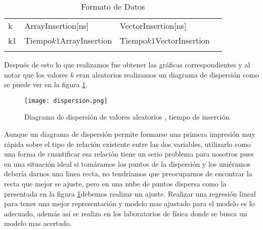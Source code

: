 \documentclass[paper=a4, fontsize=12pt]{article} 		%
\numberwithin{equation}{section}						%
\numberwithin{table}{section} 							%
\begin{document}
\begin{table}[H]
\centering
\begin{tabular}{llll}
\cline{1-3}
\multicolumn{1}{|l|}{k}  & \multicolumn{1}{l|}{ArrayInsertion{[}ns{]}} & \multicolumn{1}{l|}{VectorInsertion{[}ns{]}} &  \\ \cline{1-3}
\multicolumn{1}{|l|}{k1} & \multicolumn{1}{l|}{Tiempo$k1$ArrayInsertion}                       & \multicolumn{1}{l|}{Tiempo$k1$VectorInsertion}                        &  \\ \cline{1-3}
                         &                                             &                                              & 
\end{tabular}
\caption{Formato de Datos}
\label{formato}
\end{table}
Después de esto lo que realizamos fue obtener las gráficas correspondientes y al notar que los valores $k$ eran aleatorios realizamos un diagrama de dispersión como se puede ver en la figura \ref{fig:dispersion}. 
\begin{figure}[H]
\texttt{[image: dispersion.png]}
\caption{Diagrama de dispersión de valores aleatorios , tiempo de inserción.}
\label{fig:dispersion}
\end{figure}
Aunque un diagrama de dispersión permite formarse una primera impresión muy rápida sobre el tipo de relación existente entre las dos variables, utilizarlo como una forma de cuantificar esa relación tiene un serio problema para nosotros pues en una situación ideal si tomáramos los puntos de la dispersión y los uniéramos debería darnos una linea recta, no tendríamos que preocuparnos de encontrar la recta que mejor se ajuste, pero en una nube de puntos dispersa como la presentada en la figura \ref{fig:dispersion}debemos realizar un ajuste. Realizar una regresión lineal para tener una mejor representación y modelo mas ajustado para el modelo es lo adecuado, además así se realiza en los laboratorios de física donde se busca un modelo mas acertado. 
\end{document}

